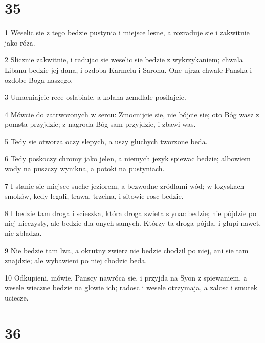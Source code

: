 \chapter{35}

\par 1 Weselic sie z tego bedzie pustynia i miejsce lesne, a rozraduje sie i zakwitnie jako róza.
\par 2 Slicznie zakwitnie, i radujac sie weselic sie bedzie z wykrzykaniem; chwala Libanu bedzie jej dana, i ozdoba Karmelu i Saronu. One ujrza chwale Panska i ozdobe Boga naszego.
\par 3 Umacniajcie rece oslabiale, a kolana zemdlale posilajcie.
\par 4 Mówcie do zatrwozonych w sercu: Zmocnijcie sie, nie bójcie sie; oto Bóg wasz z pomsta przyjdzie; z nagroda Bóg sam przyjdzie, i zbawi was.
\par 5 Tedy sie otworza oczy slepych, a uszy gluchych tworzone beda.
\par 6 Tedy poskoczy chromy jako jelen, a niemych jezyk spiewac bedzie; albowiem wody na puszczy wynikna, a potoki na pustyniach.
\par 7 I stanie sie miejsce suche jeziorem, a bezwodne zródlami wód; w lozyskach smoków, kedy legali, trawa, trzcina, i sitowie rosc bedzie.
\par 8 I bedzie tam droga i scieszka, która droga swieta slynac bedzie; nie pójdzie po niej nieczysty, ale bedzie dla onych samych. Którzy ta droga pójda, i glupi nawet, nie zbladza.
\par 9 Nie bedzie tam lwa, a okrutny zwierz nie bedzie chodzil po niej, ani sie tam znajdzie; ale wybawieni po niej chodzic beda.
\par 10 Odkupieni, mówie, Panscy nawróca sie, i przyjda na Syon z spiewaniem, a wesele wieczne bedzie na glowie ich; radosc i wesele otrzymaja, a zalosc i smutek uciecze.

\chapter{36}

